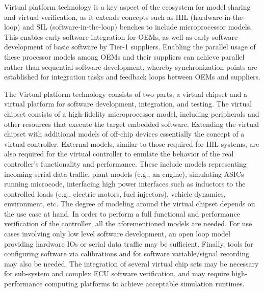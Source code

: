 Virtual platform technology is a key aspect of the ecosystem for model sharing and virtual verification,
as it extends concepts such as HIL (hardware-in-the-loop) and SIL (software-in-the-loop) benches to include microprocessor models.
This enables early software integration for OEMs,
as well as early software development of basic software by Tier-1 suppliers.
Enabling the parallel usage of these processor models among OEMs and their suppliers can achieve parallel rather than sequential software development,
whereby synchronization points are established for integration tasks and feedback loops between OEMs and suppliers.

The Virtual platform technology consists of two parts, a virtual chipset and a virtual platform for software development, integration, and testing.
The virtual chipset consists of a high-fidelity microprocessor model,
including peripherals and other resources that execute the target embedded software.
Extending the virtual chipset with additional models of off-chip devices essentially  the concept of a virtual controller.
External models, similar to those required for HIL systems, are also required for the virtual controller to emulate the behavior of the real controller's functionality and performance.
These include models representing incoming serial data traffic,
plant models (e.g., an engine), simulating ASICs running microcode, interfacing high power interfaces such as inductors to the controlled loads (e.g., electric motors, fuel injectors),
vehicle dynamics, environment, etc.
The degree of modeling around the virtual chipset depends on the use case at hand.
In order to perform a full functional and performance verification of the controller, all the aforementioned models are needed.
For use cases involving only low level software development, an open loop model providing hardware IOs or serial data traffic may be sufficient.
Finally, tools for configuring software via calibrations and for software variable/signal recording may also be needed.
The integration of several virtual chip sets may be necessary for sub-system and complex ECU software verification, and may require high-performance computing platforms to achieve acceptable simulation runtimes.